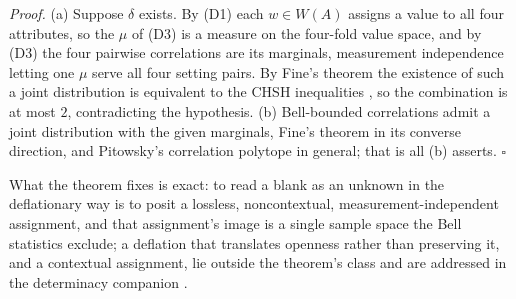 \noindent\textit{Proof.} (a) Suppose $\delta$ exists. By (D1) each $w \in W(A)$ assigns a value to all four attributes, so the $\mu$ of (D3) is a measure on the four-fold value space, and by (D3) the four pairwise correlations are its marginals, measurement independence letting one $\mu$ serve all four setting pairs. By Fine's theorem \cite{fine1982} the existence of such a joint distribution is equivalent to the CHSH inequalities \cite{pitowsky1994}, so the combination is at most $2$, contradicting the hypothesis. (b) Bell-bounded correlations admit a joint distribution with the given marginals, Fine's theorem in its converse direction, and Pitowsky's correlation polytope in general; that is all (b) asserts. \hfill$\square$

\noindent What the theorem fixes is exact: to read a blank as an unknown in the deflationary way is to posit a lossless, noncontextual, measurement-independent assignment, and that assignment's image is a single sample space the Bell statistics exclude; a deflation that translates openness rather than preserving it, and a contextual assignment, lie outside the theorem's class and are addressed in the determinacy companion \cite{AethusRealist}.




